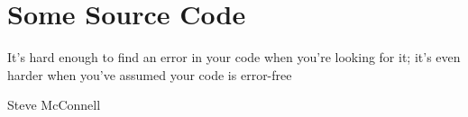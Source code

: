 \chapter{Some Source Code}
\epigraph{It's hard enough to find an error in your code when you're looking for it; it's even harder when you've assumed your code is error-free}{Steve McConnell}



\lstset{numbers=left, stepnumber=1}
